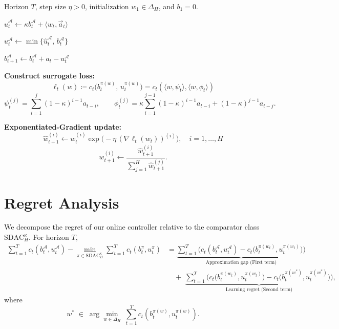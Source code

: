 \begin{algorithm}
\caption{Exponentiated-Gradient Perturbation Controller (EGPC)}
\label{alg:egpc}
\begin{algorithmic}[1]
\Require Horizon \(T\), step size \(\eta > 0\), initialization \(w_1 \in \Delta_H\), and \(b_1 = 0\).

    \State \(
        \widehat{u}_t^\mathcal{A} \gets \kappa b_t^\mathcal{A} + \langle w_t, \vec{a}_t\rangle
    \)

    \State \(u_t^\mathcal{A} \gets \min\{\widehat{u}_t^\mathcal{A},\, b_t^\mathcal{A}\}\)
        
    

    \State \(
        b_{t+1}^\mathcal{A} \gets b_t^\mathcal{A} + a_t - u_t^\mathcal{A}
    \)

    \State \textbf{Construct surrogate loss:}
    \[
        \ell_t(w) \coloneqq c_t\!\big(b_t^{\pi(w)},\,u_t^{\pi(w)}\big)
        = c_t\!\left(\langle w , \psi_t\rangle , \langle w , \phi_t\rangle\right)
    \]
    \[
        \psi_t^{(j)} = \sum_{i=1}^{j} (1-\kappa)^{i-1} a_{t-i}, 
        \qquad
        \phi_t^{(j)} = \kappa \sum_{i=1}^{j-1} (1-\kappa)^{i-1} a_{t-i}
        + (1-\kappa)^{j-1} a_{t-j}.
    \]

    \State \textbf{Exponentiated-Gradient update:}
    \[
        \widehat{w}_{t+1}^{(i)} \gets w_t^{(i)} \exp\!\big(-\eta \,(\nabla \ell_t(w_t))^{(i)}\big),
        \quad i = 1,\dots,H
    \]
    \[
        w_{t+1}^{(i)} \gets
        \frac{\widehat{w}_{t+1}^{(i)}}{\sum_{j=1}^H \widehat{w}_{t+1}^{(j)}}.
    \]
\EndFor
\end{algorithmic}
\end{algorithm}

\section{Regret Analysis}

We decompose the regret of our online controller relative to the comparator class \(\mathrm{SDAC}_H^\kappa\).  
For horizon \(T\),
\begin{align*}
\sum_{t=1}^T c_t(b_t^\mathcal{A},u_t^\mathcal{A})
- \min_{\pi\in\mathrm{SDAC}_H^\kappa} \sum_{t=1}^T c_t(b_t^\pi,u_t^\pi)
&=
\underbrace{\sum_{t=1}^T \Big( c_t(b_t^\mathcal{A},u_t^\mathcal{A}) - c_t\big(b_t^{\pi(w_t)},u_t^{\pi(w_t)}\big)\Big)}_{\text{Approximation gap (First term)}} \\
&\quad+\;
\underbrace{\sum_{t=1}^T \Big( c_t\big(b_t^{\pi(w_t)},u_t^{\pi(w_t)}\big) - c_t\big(b_t^{\pi(w^*)}, u_t^{\pi(w^*)}\big)\Big)}_{\text{Learning regret (Second term)}},
\end{align*}
where
\[
w^* \;\in\; \arg\min_{w\in\Delta_H}\; \sum_{t=1}^T c_t\!\left(b_t^{\pi(w)},u_t^{\pi(w)}\right).
\]

